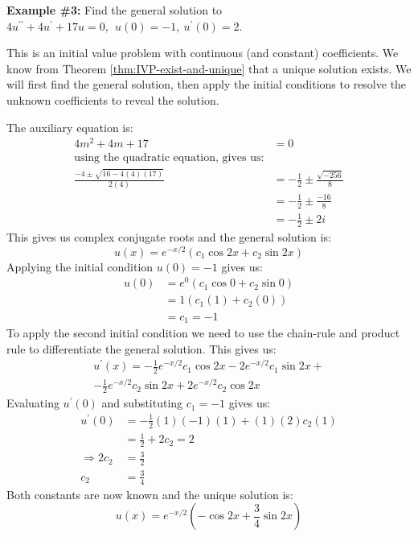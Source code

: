 \noindent\textbf{Example \#3:}
Find the general solution to $4u^{\prime \prime}+4u^{\prime} + 17u = 0, \ \ u(0)=-1, \ u^{\prime}(0)=2$.

This is an initial value problem with continuous (and constant) coefficients.  We know from Theorem \ref{thm:IVP-exist-and-unique} that a unique solution exists.  We will first find the general solution, then apply the initial conditions to resolve the unknown coefficients to reveal the solution.

The auxiliary equation is:
\begin{align*}
4m^2+4m+17 &= 0 \\
\text{using the quadratic equation, gives us:} \\
\frac{-4 \pm \sqrt{16 - 4(4)(17)}}{2(4)} &= -\frac{1}{2} \pm \frac{\sqrt{-256}}{8}\\
&= -\frac{1}{2} \pm \frac{-16}{8} \\
&= -\frac{1}{2} \pm 2i
\end{align*}
This gives us complex conjugate roots and the general solution is:
\begin{equation*}
u(x) = e^{-x/2}\left(c_1 \cos{2x} + c_2 \sin{2x} \right)
\end{equation*}
Applying the initial condition $u(0)=-1$ gives us:
\begin{align*}
u(0) &= e^{0}\left(c_1 \cos{0} + c_2 \sin{0} \right) \\
&= 1(c_1(1)+c_2(0)) \\
&= c_1 = -1
\end{align*}
To apply the second initial condition we need to use the chain-rule and product rule to differentiate the general solution.  This gives us:
\begin{multline*}
u^{\prime}(x) = -\frac{1}{2}e^{-x/2}c_1\cos{2x}-2e^{-x/2}c_1\sin{2x} + \\
-\frac{1}{2}e^{-x/2}c_2\sin{2x}+2e^{-x/2}c_2\cos{2x}
\end{multline*}
Evaluating $u^{\prime}(0)$ and substituting $c_1 = -1$ gives us:
\begin{align*}
u^{\prime}(0) &= -\frac{1}{2}(1)(-1)(1) + (1)(2)c_2(1) \\
&= \frac{1}{2}+2c_2 = 2 \\
  \Rightarrow 2c_2 &= \frac{3}{2} \\
 c_2 &= \frac{3}{4}
\end{align*}
Both constants are now known and the unique solution is:
\begin{equation*}
u(x) = e^{-x/2}\left(-\cos{2x}+\frac{3}{4}\sin{2x} \right)
\end{equation*}
